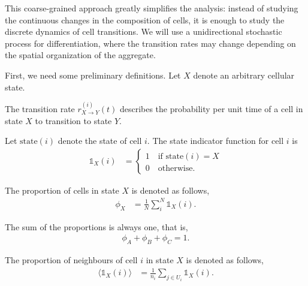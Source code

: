 This coarse-grained approach greatly simplifies the analysis: instead of studying the continuous changes in the composition of cells, it is enough to study the discrete dynamics of cell transitions. We will use a unidirectional stochastic process for differentiation, where the transition rates may change depending on the spatial organization of the aggregate. 

First, we need some preliminary definitions. Let $X$ denote an arbitrary cellular state.

\begin{definition}
    The transition rate $r_{X\rightarrow Y}^{(i)}(t)$ describes the probability per unit time of a cell in state $X$ to transition to state $Y$.
\end{definition}

\begin{definition}
    Let $\text{state}(i)$ denote the state of cell $i$. The state indicator function for cell $i$ is
    \begin{align}
        \mathds{1}_X(i)&=\begin{cases}
            1\quad\text{if }\text{state}(i)=X\\
            0\quad\text{otherwise}.
        \end{cases}
    \end{align}
\end{definition}

\begin{definition}
    The proportion of cells in state $X$ is denoted as follows,
    \begin{align}
        \phi_X&=\frac{1}{N}\sum_{i}^{N}{\mathds{1}_X(i)}.
    \end{align} 
\end{definition}

\begin{remark}
    The sum of the proportions is always one, that is,
    \begin{align*}
        \phi_A + \phi_B + \phi_C = 1.
    \end{align*}
\end{remark}

\begin{definition}\label{def:prop_ngb}
    The proportion of neighbours of cell $i$ in state $X$ is denoted as follows,
    \begin{align}
        \langle\mathds{1}_X(i)\rangle&=\frac{1}{n_i}\sum_{j\in U_i}{\mathds{1}_X(i)}.
    \end{align} 
\end{definition}

